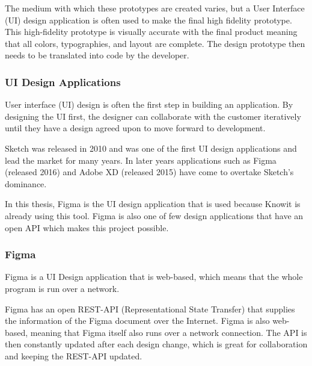 The medium with which these prototypes are created varies, but a User Interface (UI) design application is often used to make the final high fidelity prototype. This high-fidelity prototype is visually accurate with the final product meaning that all colors, typographies, and layout are complete. The design prototype then needs to be translated into code by the developer. 

\subsubsection{UI Design Applications}%
\label{ssub:Apps}
User interface (UI) design is often the first step in building an application. By designing the UI first, the designer can collaborate with the customer iteratively until they have a design agreed upon to move forward to development.

Sketch\cite{sketchDigitalDesignToolkit} was released in 2010 and was one of the first UI design applications and lead the market for many years. In later years applications such as Figma\cite{figmaFigmaCollaborativeInterface}  (released 2016) and Adobe XD\cite{adobeAdobeXDFast} (released 2015) have come to overtake Sketch's dominance. 

In this thesis, Figma is the UI design application that is used because Knowit is already using this tool. Figma is also one of few design applications that have an open API which makes this project possible. 

 






\subsubsection{Figma}%
\label{sub:Figma}
Figma is a UI Design application that is web-based, which means that the whole program is run over a network. 

Figma has an open REST-API (Representational State Transfer) that supplies the information of the Figma document over the Internet\cite{figmaFigma, RepresentationalStateTransfer2021}. Figma is also web-based, meaning that Figma itself also runs over a network connection. The API is then constantly updated after each design change, which is great for collaboration and keeping the REST-API updated.

